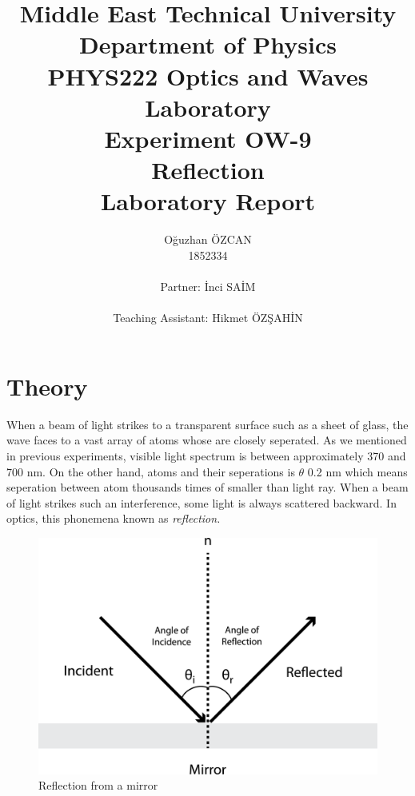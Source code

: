 \documentclass[a4paper,12pt]{report}
\title{Middle East Technical University\\Department of Physics\\PHYS222 Optics and Waves Laboratory\\\textbf{Experiment OW-9\\Reflection\\Laboratory Report}}
\author{Oğuzhan ÖZCAN\\1852334\\\\Partner: İnci SAİM\\\\Teaching Assistant: Hikmet ÖZŞAHİN}
\begin{document}
\maketitle
\tableofcontents
\listoffigures
\listoftables
\chapter{Theory}
When a beam of light strikes to a transparent surface such as a sheet of glass, the wave faces to a vast array of atoms whose are closely seperated. As we mentioned in previous experiments, visible light spectrum is between approximately 370 and 700 nm. On the other hand, atoms and their seperations is $\theta$ 0.2 nm which means seperation between atom thousands times of smaller than light ray. When a beam of light strikes such an interference, some light is always scattered backward. In optics, this phonemena known as \textit{reflection.}
\begin{figure}[h!]
\centering
\includegraphics[width=0.7\linewidth, height=0.35\textheight]{Untitled-2}
\caption{Reflection from a mirror}
\label{fig:Untitled-2}
\end{figure}
\end{document}
